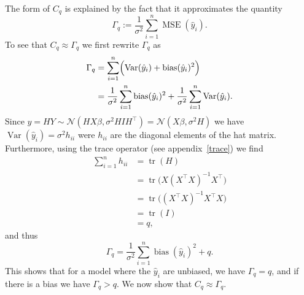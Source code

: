 \documentclass[
  a4paper,
]{article}
\theoremstyle{definition}
\theoremstyle{definition}
\theoremstyle{definition}
\theoremstyle{definition}
\theoremstyle{remark}
\begin{document}
\begin{enumerate}
  The form of \(C_q\) is explained by the fact that it approximates the
  quantity
  \begin{equation*}
    \Gamma_q
    := \frac{1}{\sigma^2} \sum_{i=1}^n \mathop{\mathrm{MSE}}\nolimits(\hat y_i).
  \end{equation*}
  To see that \(C_q \approx \Gamma_q\) we first rewrite \(\Gamma_q\) as
  \begin{align*}
    \Gamma_q
    &= \sum_{i=1}^n \Bigl( \mathop{\mathrm{Var}}(\hat y_i) + \mathop{\mathrm{bias}}(\hat y_i)^2 \Bigr) \\
    &= \frac{1}{\sigma^2} \sum_{i=1}^n \mathop{\mathrm{bias}}(\hat y_i)^2 + \frac{1}{\sigma^2} \sum_{i=1}^n \mathop{\mathrm{Var}}(\hat y_i).
  \end{align*}
  Since \(\hat y = HY \sim \mathcal{N}(HX\beta, \sigma^2 HIH^\top) = \mathcal{N}(X\beta, \sigma^2 H)\) we have \(\mathop{\mathrm{Var}}(\hat y_i) = \sigma^2 h_{ii}\) were \(h_{ii}\) are
  the diagonal elements of the hat matrix. Furthermore, using the trace
  operator (see appendix~\ref{trace}) we find
  \begin{align*}
    \sum_{i=1}^n h_{ii}
    &= \mathop{\mathrm{tr}}(H) \\
    &= \mathop{\mathrm{tr}}\bigl(X (X^\top X)^{-1} X^\top \bigr) \\
    &= \mathop{\mathrm{tr}}\bigl((X^\top X)^{-1} X^\top X \bigr) \\
    &= \mathop{\mathrm{tr}}(I) \\
    &= q,
  \end{align*}
  and thus
  \begin{equation}
    \Gamma_q
    = \frac{1}{\sigma^2} \sum_{i=1}^n \mathop{\mathrm{bias}}(\hat y_i)^2 + q.  \label{eq:Gamma-q}
  \end{equation}
  This shows that for a model where the \(\hat y_i\) are unbiased,
  we have \(\Gamma_q = q\), and if there is a bias we have \(\Gamma_q > q\).
  We now show that \(C_q \approx \Gamma_q\).


\end{enumerate}
\end{document}
